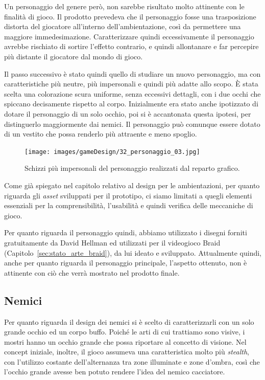 Un personaggio del genere però, non sarebbe risultato molto attinente con le finalità di gioco. Il prodotto prevedeva che il personaggio fosse una trasposizione distorta del giocatore all’interno dell’ambientazione, così da permettere una maggiore immedesimazione. Caratterizzare quindi eccessivamente il personaggio avrebbe rischiato di sortire l’effetto contrario, e quindi allontanare e far percepire più distante il giocatore dal mondo di gioco.

Il passo successivo è stato quindi quello di studiare un nuovo personaggio, ma con caratteristiche più neutre, più impersonali e quindi più adatte allo scopo.
È stata scelta una colorazione scura uniforme, senza eccessivi dettagli, con i due occhi che spiccano decisamente rispetto al corpo. Inizialmente era stato anche ipotizzato di dotare il personaggio di un solo occhio, poi si è accantonata questa ipotesi, per distinguerlo maggiormente dai nemici. Il personaggio può comunque essere dotato di un vestito che possa renderlo più attraente e meno spoglio.

\begin{figure}%
	\centering
	\texttt{[image: images/gameDesign/32\_personaggio\_03.jpg]}
	\caption{Schizzi più impersonali del personaggio realizzati dal reparto grafico.}
	\label{fig:ambientazione_personaggio_02}
\end{figure}

Come già spiegato nel capitolo relativo al design per le ambientazioni, per quanto riguarda gli \textit{asset} sviluppati per il prototipo, ci siamo limitati a quegli elementi essenziali per la comprensibilità, l’usabilità e quindi verifica delle meccaniche di gioco.

Per quanto riguarda il personaggio quindi, abbiamo utilizzato i disegni forniti gratuitamente da David Hellman \cite{DavidHellmanSite} ed utilizzati per il videogioco Braid (Capitolo~\ref{sec:stato_arte_braid}), da lui ideato e sviluppato.
Attualmente quindi, anche per quanto riguarda il personaggio principale, l’aspetto ottenuto, non è attinente con ciò che verrà mostrato nel prodotto finale.

\subsection{Nemici}
\label{sec:nemici}

Per quanto riguarda il design dei nemici si è scelto di caratterizzarli con un solo grande occhio ed un corpo buffo. Poiché le arti di cui trattiamo sono visive, i mostri hanno un occhio grande che possa riportare al concetto di visione. Nel concept iniziale, inoltre, il gioco assumeva una caratteristica molto più \textit{stealth}, con l’utilizzo costante dell’alternanza tra zone illuminate e zone d’ombra, così che l’occhio grande avesse ben potuto rendere l’idea del nemico cacciatore.

